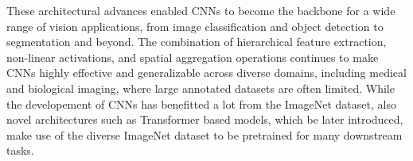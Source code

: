 These architectural advances enabled CNNs to become the backbone for a wide range of vision applications, from image classification and object detection to segmentation and beyond. The combination of hierarchical feature extraction, non-linear activations, and spatial aggregation operations continues to make CNNs highly effective and generalizable across diverse domains, including medical and biological imaging, where large annotated datasets are often limited. 
While the developement of CNNs has benefitted a lot from the ImageNet dataset, also novel architectures such as Transformer based models, which be later introduced, make use of the diverse ImageNet dataset to be pretrained for many downstream tasks. 




